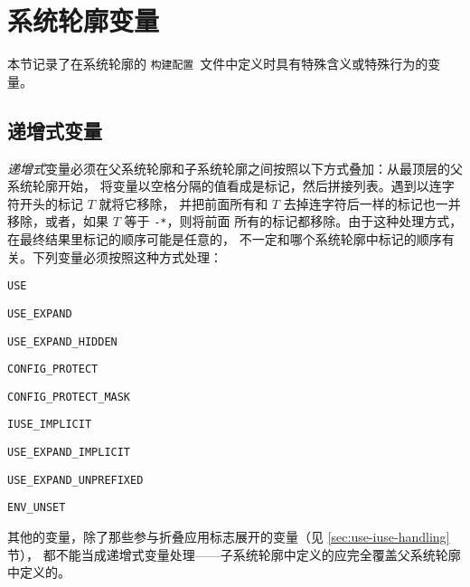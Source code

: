 \section{系统轮廓变量}
\label{sec:profile-variables}

本节记录了在系统轮廓的 \texttt{构建配置}\ 文件中定义时具有特殊含义或特殊行为的变量。

\subsection{递增式变量}
\textit{递增式}变量必须在父系统轮廓和子系统轮廓之间按照以下方式叠加：从最顶层的父系统轮廓开始，
将变量以空格分隔的值看成是标记，然后拼接列表。遇到以连字符开头的标记 $T$ 就将它移除，
并把前面所有和 $T$ 去掉连字符后一样的标记也一并移除，或者，如果 $T$ 等于 \texttt{-*}，则将前面
所有的标记都移除。由于这种处理方式，在最终结果里标记的顺序可能是任意的，
不一定和哪个系统轮廓中标记的顺序有关。下列变量必须按照这种方式处理：
\begin{compactitem}
\item \texttt{USE}
\item \texttt{USE_EXPAND}
\item \texttt{USE_EXPAND_HIDDEN}
\item \texttt{CONFIG_PROTECT}
\item \texttt{CONFIG_PROTECT_MASK}
\item \texttt{IUSE_IMPLICIT}
\item \texttt{USE_EXPAND_IMPLICIT}
\item \texttt{USE_EXPAND_UNPREFIXED}
\item \texttt{ENV_UNSET}
\end{compactitem}

其他的变量，除了那些参与折叠应用标志展开的变量（见 \ref{sec:use-iuse-handling} 节），
都不能当成递增式变量处理——子系统轮廓中定义的应完全覆盖父系统轮廓中定义的。

